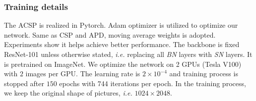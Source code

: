 \documentclass[twocolumn]{article}
\begin{document}
\subsubsection{Training details}
The ACSP is realized in Pytorch\cite{paszke2017automatic}. Adam\cite{kingma2014adam} optimizer is utilized to optimize our network. Same as CSP\cite{liu2019high} and APD\cite{DBLP:journals/corr/abs-1910-09188}, moving average weights\cite{tarvainen2017mean} is adopted. Experiments show it helps achieve better performance. The backbone is fixed ResNet-101\cite{luo2018differentiable} unless otherwise stated, \textit{i.e.} replacing all \textit{BN} layers with \textit{SN} layers. It is pretrained on ImageNet\cite{deng2009imagenet}. We optimize the network on 2 GPUs (Tesla V100) with $2$ images per GPU. The learning rate is $2 \times 10^{-4}$ and training process is stopped after $150$ epochs with 744 iterations per epoch. In the training process, we keep the original shape of pictures, \textit{i.e.} $1024 \times 2048$. 
\end{document}

